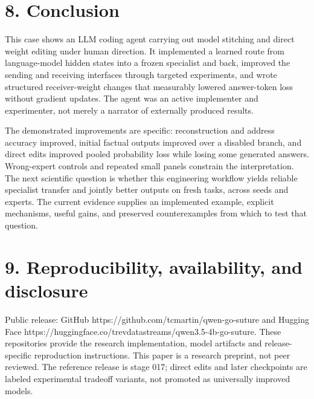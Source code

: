 \documentclass[11pt]{article}
\begin{document}
\section*{8. Conclusion}
This case shows an LLM coding agent carrying out model stitching and direct weight editing under human direction. It implemented a learned route from language-model hidden states into a frozen specialist and back, improved the sending and receiving interfaces through targeted experiments, and wrote structured receiver-weight changes that measurably lowered answer-token loss without gradient updates. The agent was an active implementer and experimenter, not merely a narrator of externally produced results.

The demonstrated improvements are specific: reconstruction and address accuracy improved, initial factual outputs improved over a disabled branch, and direct edits improved pooled probability loss while losing some generated answers. Wrong-expert controls and repeated small panels constrain the interpretation. The next scientific question is whether this engineering workflow yields reliable specialist transfer and jointly better outputs on fresh tasks, across seeds and experts. The current evidence supplies an implemented example, explicit mechanisms, useful gains, and preserved counterexamples from which to test that question.

\section*{9. Reproducibility, availability, and disclosure}
Public release: GitHub https://github.com/tcmartin/qwen-go-suture and Hugging Face https://huggingface.co/trevdatastreams/qwen3.5-4b-go-suture. These repositories provide the research implementation, model artifacts and release-specific reproduction instructions. This paper is a research preprint, not peer reviewed. The reference release is stage 017; direct edits and later checkpoints are labeled experimental tradeoff variants, not promoted as universally improved models.
\end{document}
